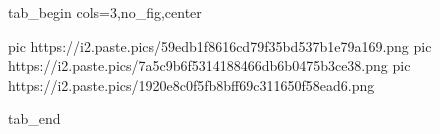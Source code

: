  
 
 
 
 


\ifcmt
  tab_begin cols=3,no_fig,center

     pic https://i2.paste.pics/59edb1f8616cd79f35bd537b1e79a169.png
		 pic https://i2.paste.pics/7a5c9b6f5314188466db6b0475b3ce38.png
		 pic https://i2.paste.pics/1920e8c0f5fb8bff69c311650f58ead6.png

  tab_end
\fi
